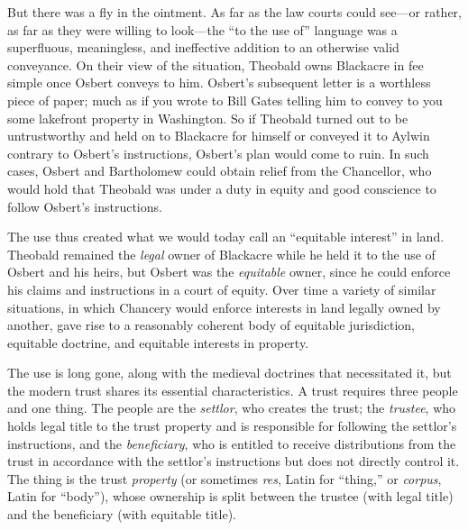 But there was a fly in the ointment. As far as the law courts could see---or
rather, as far as they were willing to look---the ``to the use of'' language was
a superfluous, meaningless, and ineffective addition to an otherwise valid
conveyance. On their view of the situation, Theobald owns Blackacre in fee
simple once Osbert conveys to him. Osbert's subsequent letter is a worthless
piece of paper; much as if you wrote to Bill Gates telling him to convey to you
some lakefront property in Washington. So if Theobald turned out to be
untrustworthy and held on to Blackacre for himself or conveyed it to Aylwin
contrary to Osbert's instructions, Osbert's plan would come to ruin. In such
cases, Osbert and Bartholomew could obtain relief from the Chancellor, who would
hold that Theobald was under a duty in equity and good conscience to follow
Osbert's instructions.

The use thus created what we would today call an ``equitable interest'' in land.
Theobald remained the \textit{legal} owner of Blackacre while he held it to the
use of Osbert and his heirs, but Osbert was the \textit{equitable} owner, since
he could enforce his claims and instructions in a court of equity. Over time a
variety of similar situations, in which Chancery would enforce interests in land
legally owned by another, gave rise to a reasonably coherent body of equitable
jurisdiction, equitable doctrine, and equitable interests in property.

The use is long gone, along with the medieval doctrines that necessitated it,
but the modern trust shares its essential characteristics. A trust requires
three people and one thing. The people are the \textit{settlor}, who creates the
trust; the \textit{trustee}, who holds legal title to the trust property and is
responsible for following the settlor's instructions, and the
\textit{beneficiary}, who is entitled to receive distributions from the trust in
accordance with the settlor's instructions but does not directly control it. The
thing is the trust \textit{property} (or sometimes \textit{res}, Latin for
``thing,'' or \textit{corpus}, Latin for ``body''), whose ownership is split
between the trustee (with legal title) and the beneficiary (with equitable
title).

